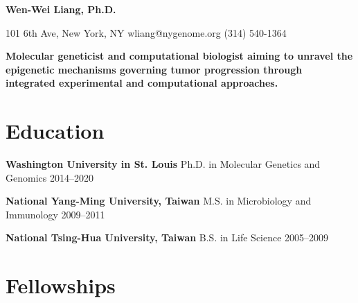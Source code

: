 \documentclass[letterpaper,11pt]{cv}
\begin{document}

\begin{minipage}[b][][c]{35em}
    \lightsourceserif\Huge\bfseries\color{color-title}
    Wen-Wei Liang, Ph.D.
\end{minipage}%
\hfill
\hspace{1em}
\begin{minipage}[b][][b]{11em}
    \raggedleft
    \small
    101 6th Ave, New York, NY \hfill
    {wliang@nygenome.org} \hfill
    (314) 540-1364
\end{minipage}

\vspace{2ex}

{
    \small\lightsourceserif\bfseries\color{color-title}
    Molecular geneticist and computational biologist aiming to unravel the epigenetic mechanisms governing tumor progression through integrated experimental and computational approaches.\par
}

\section{Education}

\begin{entrylist}

\item \textbf{Washington University in St. Louis} \hspace{2.45em} Ph.D. in Molecular Genetics and Genomics \hfill
    2014--2020 \\

\item \textbf{National Yang-Ming University, Taiwan} \hspace{0.5em} M.S. in Microbiology and Immunology \hfill
    2009--2011 \\

\item \textbf{National Tsing-Hua University, Taiwan} \hspace{0.72em} B.S. in Life Science \hfill
    2005--2009 \\

\end{entrylist}

\section{Fellowships}
\end{document}
